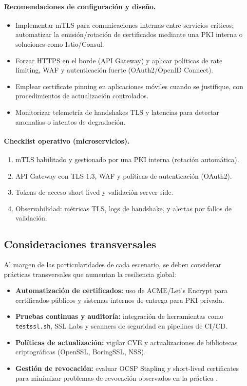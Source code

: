 \paragraph{Recomendaciones de configuración y diseño.}
\begin{itemize}
    \item Implementar mTLS para comunicaciones internas entre servicios críticos; automatizar la emisión/rotación de certificados mediante una PKI interna o soluciones como Istio/Consul.
    \item Forzar HTTPS en el borde (API Gateway) y aplicar políticas de rate limiting, WAF y autenticación fuerte (OAuth2/OpenID Connect).
    \item Emplear certificate pinning en aplicaciones móviles cuando se justifique, con procedimientos de actualización controlados.
    \item Monitorizar telemetría de handshakes TLS y latencias para detectar anomalías o intentos de degradación.
\end{itemize}

\paragraph{Checklist operativo (microservicios).}
\begin{enumerate}
    \item mTLS habilitado y gestionado por una PKI interna (rotación automática).
    \item API Gateway con TLS 1.3, WAF y políticas de autenticación (OAuth2).
    \item Tokens de acceso short-lived y validación server-side.
    \item Observabilidad: métricas TLS, logs de handshake, y alertas por fallos de validación.
\end{enumerate}

\subsection{Consideraciones transversales}
\label{subsec:consideraciones_transversales}

Al margen de las particularidades de cada escenario, se deben considerar prácticas transversales que aumentan la resiliencia global:

\begin{itemize}
    \item \textbf{Automatización de certificados:} uso de ACME/Let’s Encrypt para certificados públicos y sistemas internos de entrega para PKI privada.
    \item \textbf{Pruebas continuas y auditoría:} integración de herramientas como \texttt{testssl.sh}, SSL Labs y scanners de seguridad en pipelines de CI/CD.
    \item \textbf{Políticas de actualización:} vigilar CVE y actualizaciones de bibliotecas criptográficas (OpenSSL, BoringSSL, NSS).
    \item \textbf{Gestión de revocación:} evaluar OCSP Stapling y short-lived certificates para minimizar problemas de revocación observados en la práctica \cite{liu2015, helme2024}.
\end{itemize}

